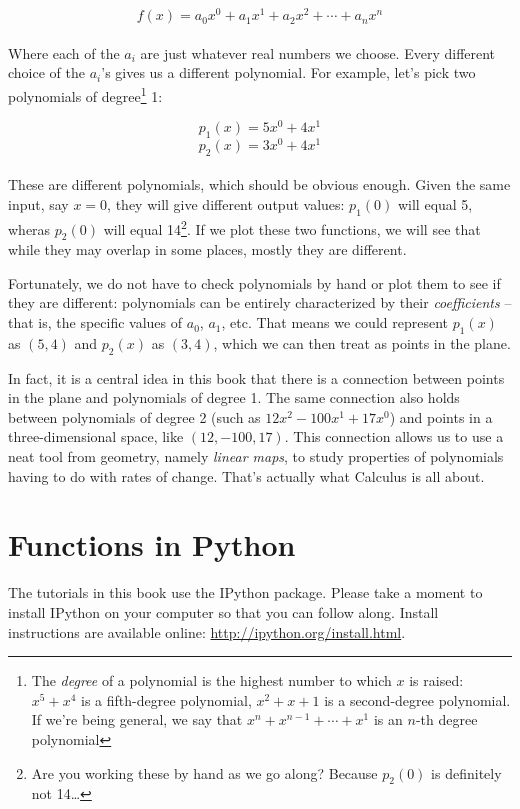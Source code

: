 \[f(x) = a_0 x^0 + a_1 x^1 + a_2 x^2 + \cdots + a_n x^n\]\\

Where each of the $a_i$ are just whatever real numbers we choose. Every different choice of the $a_i$'s gives us a different polynomial. For example, let's pick two polynomials of degree\footnote{The \emph{degree} of a polynomial is the highest number to which $x$ is raised: $x^5 + x^4$ is a fifth-degree polynomial, $x^2 + x + 1$ is a second-degree polynomial. If we're being general, we say that $x^n + x^{n-1} + \cdots + x^1$ is an $n$-th degree polynomial} 1: 

\[p_1(x) = 5 x^0 + 4 x^1\]
\[p_2(x) = 3 x^0 + 4 x^1\]\\

These are different polynomials, which should be obvious enough. Given the same input, say $x=0$, they will give different output values: $p_1(0)$ will equal 5, wheras $p_2(0)$ will equal 14\footnote{Are you working these by hand as we go along? Because $p_2(0)$ is definitely not 14\ldots}. If we plot these two functions, we will see that while they may overlap in some places, mostly they are different. 

Fortunately, we do not have to check polynomials by hand or plot them to see if they are different: polynomials can be entirely characterized by their \emph{coefficients} -- that is, the specific values of $a_0$, $a_1$, etc. That means we could represent $p_1(x)$ as $(5,4)$ and $p_2(x)$ as $(3,4)$, which we can then treat as points in the plane.

In fact, it is a central idea in this book that there is a connection between points in the plane and polynomials of degree 1. The same connection also holds between polynomials of degree 2 (such as $12x^2 - 100x^1 + 17x^0$) and points in a three-dimensional space, like $(12,-100,17)$. This connection allows us to use a neat tool from geometry, namely \emph{linear maps}, to study properties of polynomials having to do with rates of change. That's actually what Calculus is all about.

\section{Functions in Python}
The tutorials in this book use the IPython \cite{PER-GRA:2007} package. Please take a moment to install IPython on your computer so that you can follow along. Install instructions are available online: \url{http://ipython.org/install.html}.

